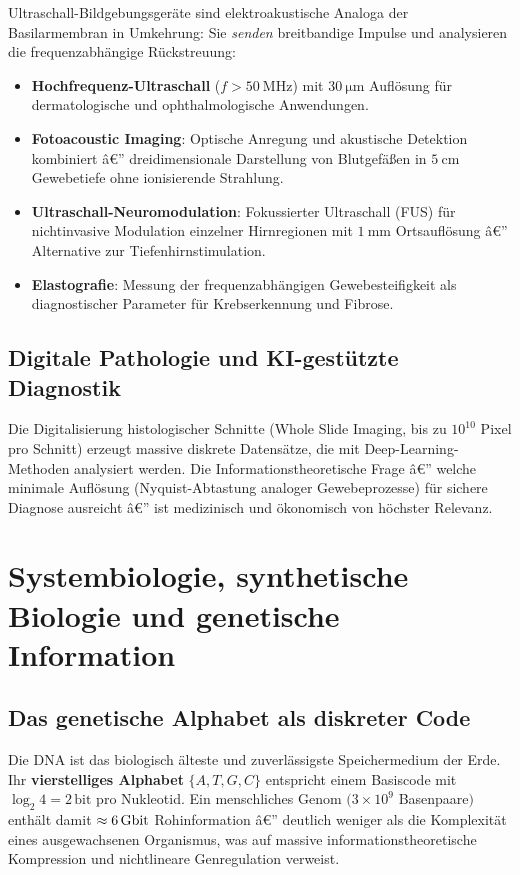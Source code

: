 ﻿\documentclass[12pt,a4paper,titlepage]{report}
\begin{document}
Ultraschall-Bildgebungsgeräte sind elektroakustische Analoga der Basilarmembran in
Umkehrung: Sie \emph{senden} breitbandige Impulse und analysieren die frequenzabhängige
Rückstreuung:
\begin{itemize}[leftmargin=2em]
    \item \textbf{Hochfrequenz-Ultraschall} ($f > \SI{50}{\mega\hertz}$) mit
        $\SI{30}{\micro\meter}$ Auflösung für dermatologische und ophthalmologische
        Anwendungen.
    \item \textbf{Fotoacoustic Imaging}: Optische Anregung und akustische
        Detektion kombiniert â€” dreidimensionale Darstellung von Blutgefäßen
        in $\SI{5}{\centi\meter}$ Gewebetiefe ohne ionisierende Strahlung.
    \item \textbf{Ultraschall-Neuromodulation}: Fokussierter Ultraschall
        (FUS) für nichtinvasive Modulation einzelner Hirnregionen mit
        $\SI{1}{\milli\meter}$ Ortsauflösung â€” Alternative zur Tiefenhirnstimulation.
    \item \textbf{Elastografie}: Messung der frequenzabhängigen Gewebesteifigkeit
        als diagnostischer Parameter für Krebserkennung und Fibrose.
\end{itemize}

\subsection{Digitale Pathologie und KI-gestützte Diagnostik}

Die Digitalisierung histologischer Schnitte (Whole Slide Imaging, bis zu
$10^{10}$ Pixel pro Schnitt) erzeugt massive diskrete Datensätze, die mit
Deep-Learning-Methoden analysiert werden. Die Informationstheoretische Frage â€”
welche minimale Auflösung (Nyquist-Abtastung analoger Gewebeprozesse) für
sichere Diagnose ausreicht â€” ist medizinisch und ökonomisch von höchster Relevanz.

\section{Systembiologie, synthetische Biologie und genetische Information}

\subsection{Das genetische Alphabet als diskreter Code}

Die DNA ist das biologisch älteste und zuverlässigste Speichermedium der Erde.
Ihr \textbf{vierstelliges Alphabet} $\{A, T, G, C\}$ entspricht einem
Basiscode mit $\log_2 4 = 2\,\text{bit}$ pro Nukleotid. Ein menschliches Genom
$(3 \times 10^9$ Basenpaare$)$ enthält damit $\approx \SI{6}{\giga\bit}$ Rohinformation â€”
deutlich weniger als die Komplexität eines ausgewachsenen Organismus, was auf
massive informationstheoretische Kompression und nichtlineare Genregulation verweist.
\end{document}
